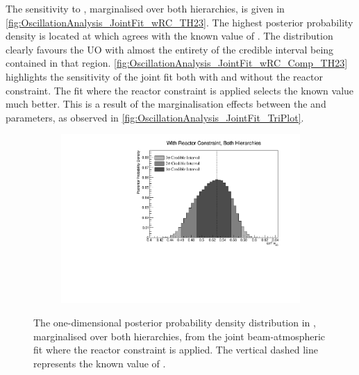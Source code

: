 The sensitivity to , marginalised over both hierarchies, is given in \autoref{fig:OscillationAnalysis_JointFit_wRC_TH23}. The highest posterior probability density is located at  which agrees with the known value of . The distribution clearly favours the UO with almost the entirety of the \quickmath{1\sigma} credible interval being contained in that region. \autoref{fig:OscillationAnalysis_JointFit_wRC_Comp_TH23} highlights the sensitivity of the joint fit both with and without the reactor constraint. The fit where the reactor constraint is applied selects the known value much better. This is a result of the marginalisation effects between the  and  parameters, as observed in \autoref{fig:OscillationAnalysis_JointFit_TriPlot}.

\begin{figure}[h]
  \begin{subfigure}[t]{0.98\textwidth}
    \includegraphics[width=\textwidth, trim={0mm 0mm 0mm 0mm}, clip,page=1]{Figures/OA/JointFit_wRC/Contours_1D_th23_BH_1_wRC_UnSmeared_CredibleInterval.pdf}
  \end{subfigure}
  \caption{The one-dimensional posterior probability density distribution in , marginalised over both hierarchies, from the joint beam-atmospheric fit where the reactor constraint is applied. The vertical dashed line represents the known value of .}
  \label{fig:OscillationAnalysis_JointFit_wRC_TH23}
\end{figure}

